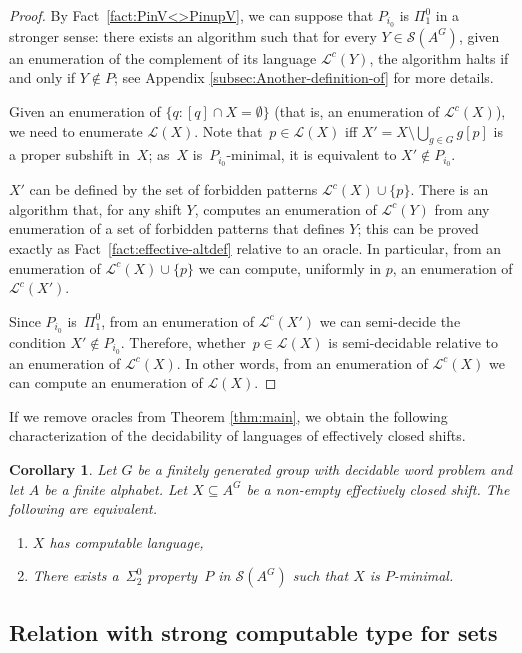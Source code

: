 \documentclass[french,american]{article}
\theoremstyle{plain}
\newtheorem{corollary}[theorem]{Corollary}
\theoremstyle{definition}
\theoremstyle{remark}
\theoremstyle{plain}
\begin{document}
\begin{proof}
By Fact~\ref{fact:PinV<>PinupV}, we can suppose that $P_{i_{0}}$ is $\Pi_{1}^{0}$
in a stronger sense: there exists an algorithm such that for every
$Y\in\mathcal{S}(A^{G})$, given an enumeration of the
complement of its language $\mathcal{L}^{c}(Y)$, the algorithm halts
if and only if $Y\notin P$; see Appendix \ref{subsec:Another-definition-of} for more details.

Given an enumeration of $\{q:[q]\cap X=\emptyset\}$ (that is,
an enumeration of $\mathcal{L}^{c}(X)$), we need to enumerate $\mathcal L(X)$. Note that~$p\in \mathcal L(X)$ iff $X' = X\setminus\bigcup_{g\in G}g[p]$
is a proper subshift in~$X$; as~$X$ is~$P_{i_{0}}$-minimal,
it is equivalent to $X'\notin P_{i_{0}}$.

$X'$ can be defined by the set of forbidden patterns $\mathcal L^c(X)\cup\{p\}$. There is an algorithm that, for any shift $Y$, computes an enumeration of $\mathcal L^c(Y)$ from any enumeration of a set of forbidden patterns that defines $Y$; this can be proved exactly as Fact~\ref{fact:effective-altdef} relative to an oracle. In particular, from an enumeration of $\mathcal L^c(X) \cup \{p\}$ we can compute, uniformly in $p$, an enumeration of $\mathcal L^c(X')$.

Since $P_{i_{0}}$ is~$\Pi_{1}^{0}$, from an enumeration of $\mathcal{L}^c(X')$
we can semi-decide the condition $X'\notin P_{i_{0}}$. Therefore, whether~$p \in \mathcal L(X)$
is semi-decidable relative to an enumeration of $\mathcal{L}^{c}(X)$. In other words, from an enumeration of $\mathcal{L}^{c}(X)$ we can compute an enumeration of $\mathcal L(X)$.
\end{proof}


If we remove oracles from Theorem \ref{thm:main}, we obtain
the following characterization of the decidability of languages of
effectively closed shifts.
\begin{corollary}
Let $G$ be a finitely generated group with decidable word problem
and let $A$ be a finite alphabet. Let $X\subseteq A^{G}$ be a non-empty
effectively closed shift. The following are equivalent.
\begin{enumerate}
\item $X$ has  computable language,
\item There exists a~$\Sigma_{2}^{0}$ property~$P$ in $\mathcal{S}(A^{G})$
such that $X$ is $P$-minimal.
\end{enumerate}
\end{corollary}


\subsection{Relation with strong computable type for sets}\label{subsec:SCTforsets}
\end{document}
